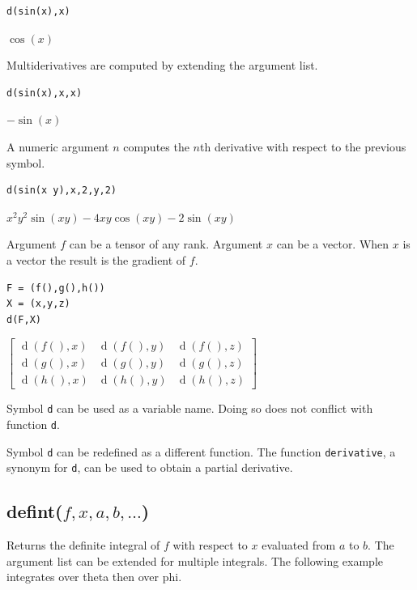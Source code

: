 \documentclass[12pt]{article}
\begin{document}
{\color{blue}
\begin{verbatim}
d(sin(x),x)
\end{verbatim}
}

$\cos(x)$

\bigskip
Multiderivatives are computed by extending the argument list.

{\color{blue}
\begin{verbatim}
d(sin(x),x,x)
\end{verbatim}
}

$-\sin(x)$

\bigskip
A numeric argument $n$ computes the $n$th derivative with respect to the previous symbol.

{\color{blue}
\begin{verbatim}
d(sin(x y),x,2,y,2)
\end{verbatim}
}

$x^2y^2\sin(xy)-4xy\cos(xy)-2\sin(xy)$

\bigskip
Argument $f$ can be a tensor of any rank.
Argument $x$ can be a vector.
When $x$ is a vector the result is the gradient of $f$.

{\color{blue}
\begin{verbatim}
F = (f(),g(),h())
X = (x,y,z)
d(F,X)
\end{verbatim}
}

$\displaystyle
\begin{bmatrix}
\operatorname{d}(f(),x) & \operatorname{d}(f(),y) &  \operatorname{d}(f(),z)
\\[1ex]
\operatorname{d}(g(),x) & \operatorname{d}(g(),y) &  \operatorname{d}(g(),z)
\\[1ex]
\operatorname{d}(h(),x) & \operatorname{d}(h(),y) &  \operatorname{d}(h(),z)
\end{bmatrix}
$

\bigskip
Symbol \verb$d$ can be used as a variable name.
Doing so does not conflict with function \verb$d$.

\bigskip
Symbol \verb$d$ can be redefined as a different function.
The function \verb$derivative$, a synonym for \verb$d$, can be used to obtain a partial derivative.

\subsection*{defint($f,x,a,b,\ldots$)}

Returns the definite integral of $f$ with respect to $x$
evaluated from $a$ to $b$.
The argument list can be extended for multiple integrals.
The following example integrates over theta then over phi.
\end{document}
